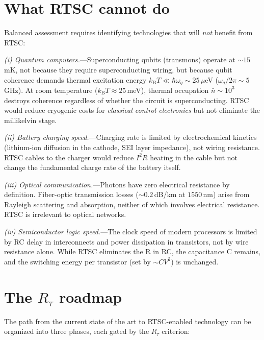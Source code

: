 \documentclass[prl,twocolumn,superscriptaddress,longbibliography,floatfix]{revtex4-2}
\newcommand{\kB}{k_{\mathrm{B}}}
\newcommand{\tauasym}{\tau}
\newcommand{\Rtau}{R_{\tauasym}}
\begin{document}
\section{What RTSC cannot do}
\label{sec:cannot}

Balanced assessment requires identifying technologies that
will \emph{not} benefit from RTSC:

\emph{(i) Quantum computers.}---Superconducting qubits
(transmons) operate at $\sim 15\,$mK, not because they
require superconducting wiring, but because qubit
coherence demands thermal excitation energy
$\kB T \ll \hbar\omega_q \sim 25\,\mu$eV ($\omega_q/2\pi
\sim 5\,$GHz).  At room temperature ($\kB T \approx 25\,$meV),
thermal occupation $\bar{n} \sim 10^3$ destroys coherence
regardless of whether the circuit is superconducting.  RTSC
would reduce cryogenic costs for \emph{classical control
electronics} but not eliminate the millikelvin stage.

\emph{(ii) Battery charging speed.}---Charging rate is limited
by electrochemical kinetics (lithium-ion diffusion in the
cathode, SEI layer impedance), not wiring resistance.  RTSC
cables to the charger would reduce $I^2 R$ heating in the
cable but not change the fundamental charge rate of the
battery itself.

\emph{(iii) Optical communication.}---Photons have zero
electrical resistance by definition.  Fiber-optic
transmission losses ($\sim 0.2\,$dB/km at $1550\,$nm) arise
from Rayleigh scattering and absorption, neither of which
involves electrical resistance.  RTSC is irrelevant to
optical networks.

\emph{(iv) Semiconductor logic speed.}---The clock speed of
modern processors is limited by RC delay in interconnects and
power dissipation in transistors, not by wire resistance alone.
While RTSC eliminates the R in RC, the capacitance C remains,
and the switching energy per transistor (set by $\sim C V^2$)
is unchanged.

\section{The $\Rtau$ roadmap}
\label{sec:roadmap}

The path from the current state of the art to RTSC-enabled
technology can be organized into three phases, each gated
by the $\Rtau$ criterion:
\end{document}
